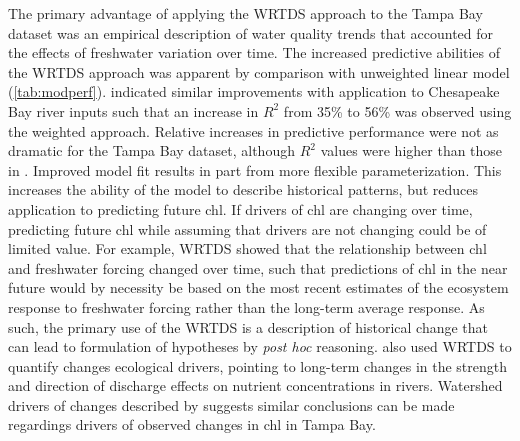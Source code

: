 \documentclass[letterpaper,12pt,oneside]{article}\usepackage{graphicx, color}
\begin{document}
The primary advantage of applying the \ac{WRTDS} approach to the Tampa Bay dataset was an empirical description of water quality trends that accounted for the effects of freshwater variation over time. The increased predictive abilities of the \ac{WRTDS} approach was apparent by comparison with unweighted linear model (\cref{tab:modperf}).  \citet{Hirsch10} indicated similar improvements with application to Chesapeake Bay river inputs such that an increase in $R^2$ from 35\% to 56\% was observed using the weighted approach.  Relative increases in predictive performance were not as dramatic for the Tampa Bay dataset, although $R^2$ values were higher than those in \citet{Hirsch10}.  Improved model fit results in part from more flexible parameterization.  This increases the ability of the model to describe historical patterns, but reduces application to predicting future \ac{chl}.  If drivers of \ac{chl} are changing over time, predicting future \ac{chl} while assuming that drivers are not changing could be of limited value.  For example, \ac{WRTDS} showed that the relationship between \ac{chl} and freshwater forcing changed over time, such that predictions of \ac{chl} in the near future would by necessity be based on the most recent estimates of the ecosystem response to freshwater forcing rather than the long-term average response.  As such, the primary use of the \ac{WRTDS} is a description of historical change that can lead to formulation of hypotheses by \textit{post hoc} reasoning.  \citet{Hirsch10} also used WRTDS to quantify changes ecological drivers, pointing to long-term changes in the strength and direction of discharge effects on nutrient concentrations in rivers.  Watershed drivers of changes described by \citet{Hirsch10} suggests similar conclusions can be made regardings drivers of observed changes in \ac{chl} in Tampa Bay.  
\end{document}
